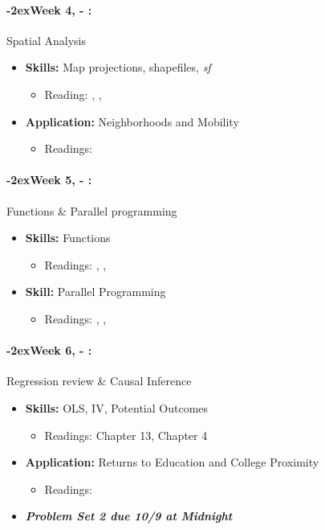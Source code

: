 \documentclass[11pt]{article}
\newcommand{\week}[1]{%
  \paragraph*{\kern-2ex\quad #1, \AdvanceDate[1]\syldate{\today} - \AdvanceDate[2]\syldate{\today}:}%
  \ifdim\wd1=\wd\MONDAY
    \AdvanceDate[7]
  \else
    \AdvanceDate[7]
  \fi%
}
\begin{document}
\week{Week 4} Spatial Analysis
\begin{itemize}
  \item \textbf{Skills:} Map projections, shapefiles, \textit{sf}
  \begin{itemize}
    \item Reading: \textbf{\cite{mcdermott2023spatial}}, \cite{crs}, \cite{lovelace2019geographic}
  \end{itemize}
  \item \textbf{Application:} Neighborhoods and Mobility
  \begin{itemize}
    \item Readings: \textbf{\cite{chetty2018opportunityatlas}}
  \end{itemize}
\end{itemize}
\week{Week 5} Functions \& Parallel programming
\begin{itemize}
  \item \textbf{Skills:} Functions
  \begin{itemize}
    \item Readings: \cite{mcdermott2023functionsintro}, \cite{mcdermott2023functionsadvanced} \cite{wickham2023meta}, \cite{tidyeval}
  \end{itemize}
  \item \textbf{Skill:} Parallel Programming
  \begin{itemize}
    \item Readings: \textbf{\cite{mcdermott2023parallel}}, \cite{eddelbuettel2020parallel}, \cite{mcdermott2023parallel}
  \end{itemize}
\end{itemize}
\week{Week 6} Regression review \& Causal Inference
\begin{itemize}
  \item \textbf{Skills:} OLS, IV, Potential Outcomes
  \begin{itemize}
    \item Readings: \cite{hungtintonklein2023effect} Chapter 13, \cite{cunningham2023mixtape} Chapter 4
  \end{itemize}
  \item \textbf{Application:} Returns to Education and College Proximity
  \begin{itemize}
    \item Readings: \textbf{\cite{card1993college}}
  \end{itemize}
  \item \textit{\textbf{Problem Set 2 due 10/9 at Midnight}}
\end{itemize}
\end{document}
